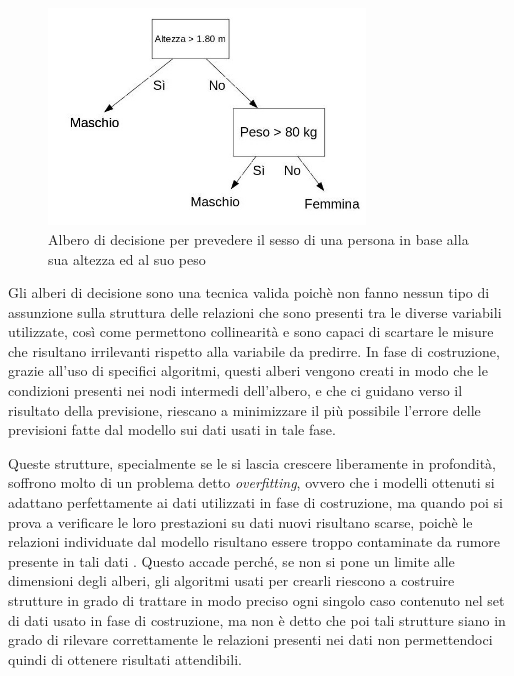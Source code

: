 \documentclass[a4paper]{report}
\begin{document}


\begin{figure}[h]
\centering
\includegraphics[width=0.75\textwidth]{decision_tree}
\caption{Albero di decisione per prevedere il sesso di una persona in base alla sua altezza ed al suo peso}
\label{fig:decision_tree}
\end{figure}

Gli alberi di decisione sono una tecnica valida poichè non fanno nessun tipo di assunzione sulla struttura delle relazioni che sono presenti tra le diverse variabili utilizzate, così come permettono collinearità e sono capaci di scartare le misure che risultano irrilevanti rispetto alla variabile da predirre. In fase di costruzione, grazie all'uso di specifici algoritmi, questi alberi vengono creati in modo che le condizioni presenti nei nodi intermedi dell'albero, e che ci guidano verso il risultato della previsione, riescano a minimizzare il più possibile l'errore delle previsioni fatte dal modello sui dati usati in tale fase.

Queste strutture, specialmente se le si lascia crescere liberamente in profondità, soffrono molto di un problema detto \textit{overfitting}, ovvero che i modelli ottenuti si adattano perfettamente ai dati utilizzati in fase di costruzione, ma quando poi si prova a verificare le loro prestazioni su dati nuovi risultano scarse, poichè le relazioni individuate dal modello risultano essere troppo contaminate da rumore presente in tali dati \cite{bramer2007avoiding}. Questo accade perché, se non si pone un limite alle dimensioni degli alberi, gli algoritmi usati per crearli riescono a costruire strutture in grado di trattare in modo preciso ogni singolo caso contenuto nel set di dati usato in fase di costruzione, ma non è detto che poi tali strutture siano in grado di rilevare correttamente le relazioni presenti nei dati non permettendoci quindi di ottenere risultati attendibili.
\end{document}
